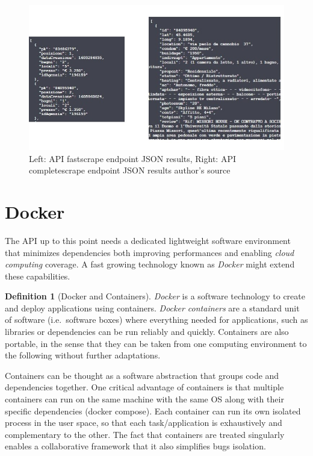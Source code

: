 \documentclass[
  12pt,
  a4paper,
  oneside]{book}
\theoremstyle{definition}
\newtheorem{definition}{Definition}[chapter]
\theoremstyle{definition}
\theoremstyle{definition}
\theoremstyle{remark}
\begin{document}
\begin{figure}
\centering
\includegraphics{images/endpoint1and2.jpg}
\caption{\label{fig:endpoint1and2}Left: API fastscrape endpoint JSON results, Right: API completescrape endpoint JSON results author's source}
\end{figure}

\hypertarget{docker}{%
\section{Docker}\label{docker}}

The API up to this point needs a dedicated lightweight software environment that minimizes dependencies both improving performances and enabling \emph{cloud computing} coverage. A fast growing technology known as \emph{Docker} might extend these capabilities.
\begin{definition}[Docker and Containers]
\protect\hypertarget{def:docker}{}{\label{def:docker} {} }\emph{Docker} \citep{docker} is a software technology to create and deploy applications using containers.
\emph{Docker containers} are a standard unit of software (i.e.~software boxes) where everything needed for applications, such as libraries or dependencies can be run reliably and quickly. Containers are also portable, in the sense that they can be taken from one computing environment to the following without further adaptations.
\end{definition}
Containers can be thought as a software abstraction that groups code and dependencies together. One critical advantage of containers is that multiple containers can run on the same machine with the same OS along with their specific dependencies (docker compose). Each container can run its own isolated process in the user space, so that each task/application is exhaustively and complementary to the other. The fact that containers are treated singularly enables a collaborative framework that it also simplifies bugs isolation.
\end{document}
